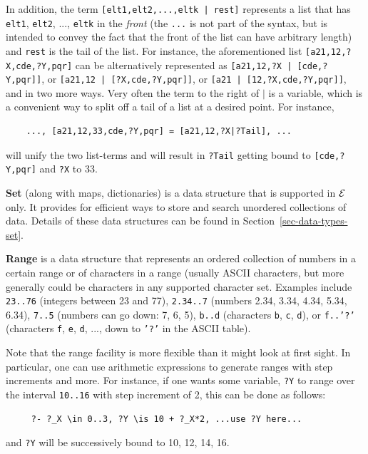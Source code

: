 \documentclass[11pt]{article}
\newcommand{\ERGO}{\mbox{\ensuremath{\cal{E}}\smaller{{\sc{RGO}}}}\xspace}
\begin{document}
In addition, the term \texttt{[elt1,elt2,...,eltk |
rest]} represents a list that has \texttt{elt1}, \texttt{elt2}, ...,
\texttt{eltk} in the \emph{front}
(the \texttt{...} is not part of the syntax, but is intended
to convey the fact that the front of the list can have arbitrary length)      
and \texttt{rest} is the tail of the list. For instance, the aforementioned list
\texttt{[a21,12,?X,cde,?Y,pqr]} can be alternatively represented as
\texttt{[a21,12,?X | [cde,?Y,pqr]]}, or \texttt{[a21,12 | [?X,cde,?Y,pqr]]},
or \texttt{[a21 | [12,?X,cde,?Y,pqr]]}, and in two more ways.  Very often
the term to the right of $\mid$ is a variable, which is a convenient way to
split off a tail of a list at a desired point. For instance,
\begin{verbatim}
    ..., [a21,12,33,cde,?Y,pqr] = [a21,12,?X|?Tail], ...
\end{verbatim}
will unify the two list-terms and will result in \texttt{?Tail} getting
bound to \texttt{[cde,?Y,pqr]} and \texttt{?X} to 33.   

\noindent
\textbf{Set} (along with maps, dictionaries) is a data structure that is
supported in \ERGO only. It provides for efficient ways to store and search
unordered collections of data.
Details of these data structures can be found in
Section~\ref{sec-data-types-set}.

\noindent
\textbf{Range} is a data structure that represents an ordered collection of
numbers in a certain range or of characters in a range (usually ASCII
characters, but more generally could be characters in any supported
character set. Examples include  \texttt{23..76} (integers between 23 and 77),
\texttt{2.34..7} (numbers 2.34, 3.34, 4.34, 5.34, 6.34),  \texttt{7..5}
(numbers can go down: 7, 6, 5),  \texttt{b..d} (characters \texttt{b}, \texttt{c},
\texttt{d}), or  \texttt{f..'?'} (characters \texttt{f}, \texttt{e},
\texttt{d}, ..., down to \texttt{'?'} in the ASCII table).         

Note that the range facility is more flexible than it might look at first
sight. In particular, one can use arithmetic expressions to generate ranges
with step increments and more. For instance, if one wants some variable,
\texttt{?Y} to range over the interval \texttt{10..16} with step increment
of 2, this can be done as follows:
\begin{verbatim}
     ?- ?_X \in 0..3, ?Y \is 10 + ?_X*2, ...use ?Y here...
\end{verbatim}
and \texttt{?Y} will be successively bound to 10, 12, 14, 16. 
\end{document}
